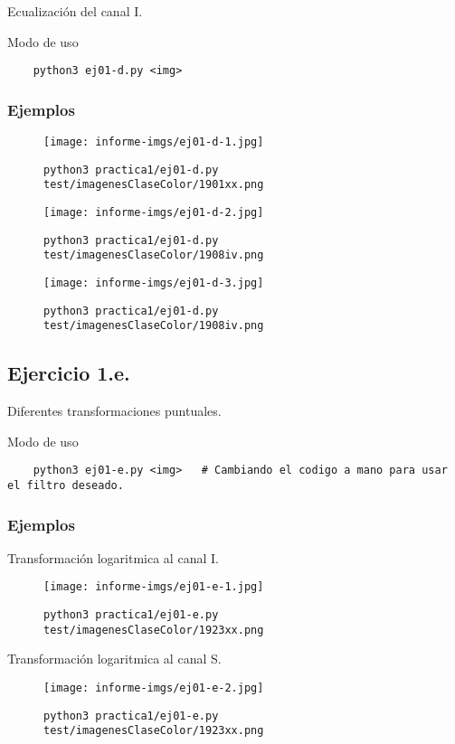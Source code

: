 \documentclass[11pt, spanish]{article}
\begin{document}
Ecualización del canal I.

Modo de uso
\begin{verbatim}
    python3 ej01-d.py <img>
\end{verbatim}

\subsubsection*{Ejemplos}
\begin{figure}[H]
\centering
  \texttt{[image: informe-imgs/ej01-d-1.jpg]}
  \caption{\texttt{python3 practica1/ej01-d.py test/imagenesClaseColor/1901xx.png}}
\end{figure}
\begin{figure}[H]
\centering
  \texttt{[image: informe-imgs/ej01-d-2.jpg]}
  \caption{\texttt{python3 practica1/ej01-d.py test/imagenesClaseColor/1908iv.png}}
\end{figure}
\begin{figure}[H]
\centering
  \texttt{[image: informe-imgs/ej01-d-3.jpg]}
  \caption{\texttt{python3 practica1/ej01-d.py test/imagenesClaseColor/1908iv.png}}
\end{figure}

\subsection{Ejercicio 1.e.}

Diferentes transformaciones puntuales.

Modo de uso
\begin{verbatim}
    python3 ej01-e.py <img>   # Cambiando el codigo a mano para usar el filtro deseado.
\end{verbatim}

\subsubsection*{Ejemplos}
Transformación logaritmica al canal I.
\begin{figure}[H]
\centering
  \texttt{[image: informe-imgs/ej01-e-1.jpg]}
  \caption{\texttt{python3 practica1/ej01-e.py test/imagenesClaseColor/1923xx.png}}
\end{figure}

Transformación logaritmica al canal S.
\begin{figure}[H]
\centering
  \texttt{[image: informe-imgs/ej01-e-2.jpg]}
  \caption{\texttt{python3 practica1/ej01-e.py test/imagenesClaseColor/1923xx.png}}
\end{figure}
\end{document}
